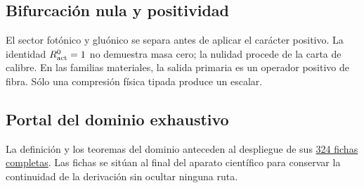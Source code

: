 \begingroup
\let\chapter\section
\let\section\subsection
\let\subsection\subsubsection
\let\subsubsection\paragraph
\let\clearpage\relax

\endgroup

\section{Bifurcación nula y positividad}
El sector fotónico y gluónico se separa antes de aplicar el carácter positivo.
La identidad \(R_{\rm act}^{0}=1\) no demuestra masa cero; la nulidad procede
de la carta de calibre. En las familias materiales, la salida primaria es un
operador positivo de fibra. Sólo una compresión física tipada produce un
escalar.

\section{Portal del dominio exhaustivo}
La definición y los teoremas del dominio anteceden al despliegue de sus
\hyperref[chap:atlas-genealogico-exhaustivo-324-rutas]{324 fichas completas}.
Las fichas se sitúan al final del aparato científico para conservar la
continuidad de la derivación sin ocultar ninguna ruta.
